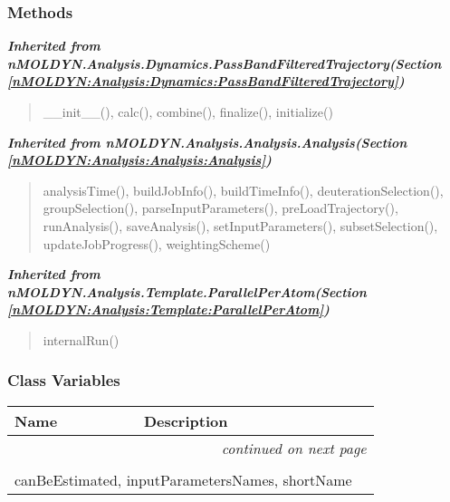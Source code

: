 
  \subsubsection{Methods}


\large{\textbf{\textit{Inherited from nMOLDYN.Analysis.Dynamics.PassBandFilteredTrajectory\textit{(Section \ref{nMOLDYN:Analysis:Dynamics:PassBandFilteredTrajectory})}}}}

\begin{quote}
\_\_init\_\_(), calc(), combine(), finalize(), initialize()
\end{quote}

\large{\textbf{\textit{Inherited from nMOLDYN.Analysis.Analysis.Analysis\textit{(Section \ref{nMOLDYN:Analysis:Analysis:Analysis})}}}}

\begin{quote}
analysisTime(), buildJobInfo(), buildTimeInfo(), deuterationSelection(), groupSelection(), parseInputParameters(), preLoadTrajectory(), runAnalysis(), saveAnalysis(), setInputParameters(), subsetSelection(), updateJobProgress(), weightingScheme()
\end{quote}

\large{\textbf{\textit{Inherited from nMOLDYN.Analysis.Template.ParallelPerAtom\textit{(Section \ref{nMOLDYN:Analysis:Template:ParallelPerAtom})}}}}

\begin{quote}
internalRun()
\end{quote}


  \subsubsection{Class Variables}

    \vspace{-1cm}
\hspace{\varindent}\begin{longtable}{|p{\varnamewidth}|p{\vardescrwidth}|l}
\cline{1-2}
\cline{1-2} \centering \textbf{Name} & \centering \textbf{Description}& \\
\cline{1-2}
\endhead\cline{1-2}\multicolumn{3}{r}{\small\textit{continued on next page}}\\\endfoot\cline{1-2}
\endlastfoot\multicolumn{2}{|l|}{\textit{Inherited from nMOLDYN.Analysis.Dynamics.PassBandFilteredTrajectory \textit{(Section \ref{nMOLDYN:Analysis:Dynamics:PassBandFilteredTrajectory})}}}\\
\multicolumn{2}{|p{\varwidth}|}{\raggedright canBeEstimated, inputParametersNames, shortName}\\
\cline{1-2}
\end{longtable}


